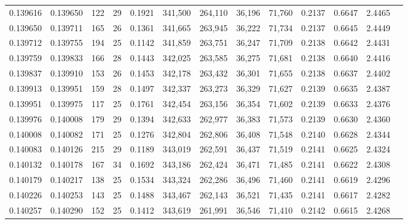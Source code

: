 \begin{tabular}{rrrrrrrrrrrrr}
0.139616 & 0.139650 & 122 &  29 &                                     0.1921 & 341,500 & 264,110 &  36,196 &  71,760 & 0.2137 & 0.6647 & 2.4465 \\
0.139650 & 0.139711 & 165 &  26 &                                     0.1361 & 341,665 & 263,945 &  36,222 &  71,734 & 0.2137 & 0.6645 & 2.4449 \\
0.139712 & 0.139755 & 194 &  25 &                                     0.1142 & 341,859 & 263,751 &  36,247 &  71,709 & 0.2138 & 0.6642 & 2.4431 \\
0.139759 & 0.139833 & 166 &  28 &                                     0.1443 & 342,025 & 263,585 &  36,275 &  71,681 & 0.2138 & 0.6640 & 2.4416 \\
0.139837 & 0.139910 & 153 &  26 &                                     0.1453 & 342,178 & 263,432 &  36,301 &  71,655 & 0.2138 & 0.6637 & 2.4402 \\
0.139913 & 0.139951 & 159 &  28 &                                     0.1497 & 342,337 & 263,273 &  36,329 &  71,627 & 0.2139 & 0.6635 & 2.4387 \\
0.139951 & 0.139975 & 117 &  25 &                                     0.1761 & 342,454 & 263,156 &  36,354 &  71,602 & 0.2139 & 0.6633 & 2.4376 \\
0.139976 & 0.140008 & 179 &  29 &                                     0.1394 & 342,633 & 262,977 &  36,383 &  71,573 & 0.2139 & 0.6630 & 2.4360 \\
0.140008 & 0.140082 & 171 &  25 &                                     0.1276 & 342,804 & 262,806 &  36,408 &  71,548 & 0.2140 & 0.6628 & 2.4344 \\
0.140083 & 0.140126 & 215 &  29 &                                     0.1189 & 343,019 & 262,591 &  36,437 &  71,519 & 0.2141 & 0.6625 & 2.4324 \\
0.140132 & 0.140178 & 167 &  34 &                                     0.1692 & 343,186 & 262,424 &  36,471 &  71,485 & 0.2141 & 0.6622 & 2.4308 \\
0.140179 & 0.140217 & 138 &  25 &                                     0.1534 & 343,324 & 262,286 &  36,496 &  71,460 & 0.2141 & 0.6619 & 2.4296 \\
0.140226 & 0.140253 & 143 &  25 &                                     0.1488 & 343,467 & 262,143 &  36,521 &  71,435 & 0.2141 & 0.6617 & 2.4282 \\
0.140257 & 0.140290 & 152 &  25 &                                     0.1412 & 343,619 & 261,991 &  36,546 &  71,410 & 0.2142 & 0.6615 & 2.4268 \\

\end{tabular}
